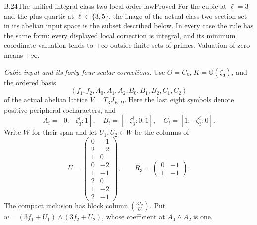 \begin{statement}{B.24}{The unified integral class-two local-order law}{Proved}
For the cubic at $\ell=3$ and the plus quartic at
$\ell\in\{3,5\}$, the image of the actual class-two section
set in its abelian input space is the subset described below.
In every case the rule has the same form: every displayed
local correction is integral, and its minimum coordinate
valuation tends to $+\infty$ outside finite sets of primes.
Valuation of zero means $+\infty$.

\emph{Cubic input and its forty-four scalar corrections.}
Use $O=C_0$, $K=\mathbb Q(\zeta_3)$, and the ordered basis
\[
 (f_1,f_2,A_0,A_1,A_2,B_0,B_1,B_2,C_1,C_2)
                                                               \tag{B.24.1}
\]
of the actual abelian lattice $V=T_3J_{E,D}$. Here the last
eight symbols denote positive peripheral cocharacters, and
\[
 A_i=[0:-\zeta_3^i:1],\quad
 B_i=[-\zeta_3^i:0:1],\quad C_i=[1:-\zeta_3^i:0].
\]
Write $W$ for their span and let $U_1,U_2\in W$ be the
columns of
\[
 U=\begin{pmatrix}
 0&-1\\2&-2\\1&0\\0&-2\\1&-1\\2&0\\1&-2\\2&-1
 \end{pmatrix},\qquad
 R_3=\begin{pmatrix}0&-1\\1&-1\end{pmatrix}.
                                                               \tag{B.24.2}
\]
The compact inclusion has block column $\binom{3I_2}{U}$.
Put $w=(3f_1+U_1)\wedge(3f_2+U_2)$, whose coefficient at
$A_0\wedge A_2$ is one.


\end{statement}
